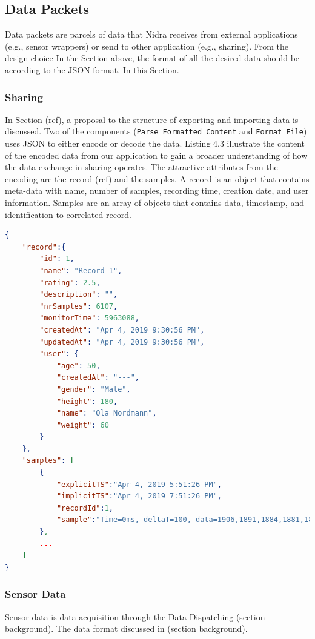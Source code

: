 \begin{table}
\begin{center}
\caption{Example entry in record table}
\end{center}
\end{table}

\subsection{Data Packets}
Data packets are parcels of data that Nidra receives from external applications (e.g., sensor wrappers) or send to other application (e.g., sharing). From the design choice In the Section above, the format of all the desired data should be according to the JSON format.  In this Section.

\subsubsection{Sharing}

In Section (ref), a proposal to the structure of exporting and importing data is discussed. Two of the components (\verb|Parse Formatted Content| and \verb|Format File|) uses JSON to either encode or decode the data. Listing 4.3 illustrate the content of the encoded data from our application to gain a broader understanding of how the data exchange in sharing operates. The attractive attributes from the encoding are the record (ref) and the samples.  A record is an object that contains meta-data with name, number of samples, recording time, creation date, and user information. Samples are an array of objects that contains data, timestamp, and identification to correlated record. 

    
\begin{lstlisting}[language=json, caption={My Caption}, captionpos=b]
{
    "record":{  
        "id": 1,
        "name": "Record 1",
        "rating": 2.5,
        "description": "",
        "nrSamples": 6107,
        "monitorTime": 5963088,
        "createdAt": "Apr 4, 2019 9:30:56 PM",
        "updatedAt": "Apr 4, 2019 9:30:56 PM",
        "user": {  
            "age": 50,
            "createdAt": "---",
            "gender": "Male",
            "height": 180,
            "name": "Ola Nordmann",
            "weight": 60
        }
    },
    "samples": [  
        {  
            "explicitTS":"Apr 4, 2019 5:51:26 PM",
            "implicitTS":"Apr 4, 2019 7:51:26 PM",
            "recordId":1,
            "sample":"Time=0ms, deltaT=100, data=1906,1891,1884,1881,1876,1718,1690"
        },
        ...
    ]
}
\end{lstlisting}

\subsubsection{Sensor Data}
Sensor data is data acquisition through the Data Dispatching (section background). The data format discussed in (section background). 
